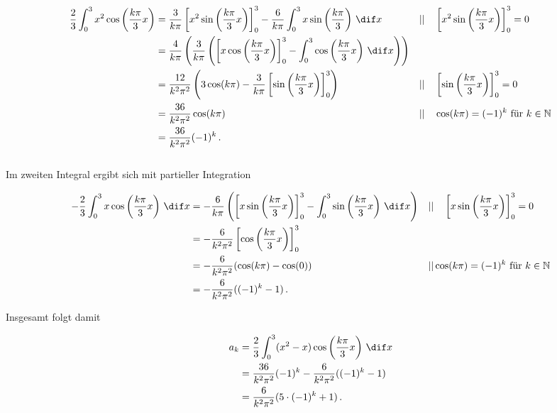 \begin{align*}
    \frac{2}{3}\int_0^3 x^2 \cos \left(\frac{k\pi}{3}x\right) &= \frac{3}{k\pi} \left[x^2 \sin\left(\frac{k\pi}{3}x\right)\right]_0^3 - \frac{6}{k\pi} \int_0^3 x \sin\left(\frac{k\pi}{3}\right) \,\dif x && || \quad \left[x^2 \sin\left(\frac{k\pi}{3}x\right)\right]_0^3 = 0 \\
                                                              &= \frac{4}{k\pi} \left(\frac{3}{k\pi} \left(\left[x \cos\left(\frac{k\pi}{3}x\right)\right]_0^3 -  \int_0^3 \cos\left(\frac{k\pi}{3}x\right) \,\dif x \right)\right) \\
                                                              &= \frac{12}{k^2\pi^2} \left(3 \cos(k\pi) - \frac{3}{k\pi} \left[\sin\left(\frac{k\pi}{3}x\right)\right]_0^3\right) && || \quad \left[\sin\left(\frac{k\pi}{3}x\right)\right]_0^3 = 0 \\
                                                              &= \frac{36}{k^2\pi^2} \cos(k\pi) && || \quad \cos(k\pi) = (-1)^k \text{ für } k \in \mathbb{N} \\
                                                              &= \frac{36}{k^2\pi^2} (-1)^k \,.
\end{align*} \\

Im zweiten Integral ergibt sich mit partieller Integration

\begin{align*}
    - \frac{2}{3} \int_0^3 x \cos\left(\frac{k\pi}{3}x\right) \,\dif x &= - \frac{6}{k\pi} \left(\left[x\sin\left(\frac{k\pi}{3} x\right)\right]_0^3 - \int_0^3 \sin\left(\frac{k\pi}{3}x\right) \,\dif x\right) && || \quad \left[x\sin\left(\frac{k\pi}{3} x\right)\right]_0^3 = 0 \\
                                                                       &= - \frac{6}{k^2\pi^2} \left[\cos\left(\frac{k\pi}{3}x\right)\right]_0^3 \\
                                                                       &= - \frac{6}{k^2\pi^2} (\cos(k\pi) - \cos(0)) && || \cos(k\pi) = (-1)^k \text{ für } k \in \mathbb{N} \\
                                                                       &= - \frac{6}{k^2\pi^2} ((-1)^k - 1) \,.
\end{align*}

Insgesamt folgt damit

\begin{align*}
    a_k &= \frac{2}{3} \int_0^3 (x^2-x) \cos \left(\frac{k\pi}{3}x\right) \,\dif x \\
        &= \frac{36}{k^2\pi^2} (-1)^k - \frac{6}{k^2\pi^2} ((-1)^k - 1) \\
        &= \frac{6}{k^2\pi^2}(5 \cdot (-1)^k + 1) \,.
\end{align*}

